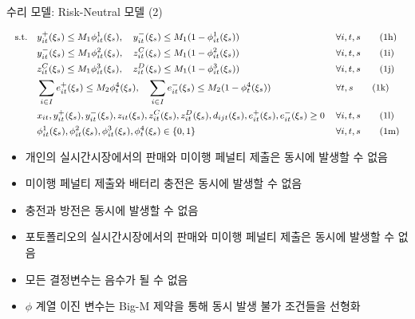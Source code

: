 \documentclass[xcolor=dvipsnames,t,9pt]{beamer}
\begin{document}
\begin{frame}{수리 모델: Risk-Neutral 모델 (2)}
    \vspace{-1em}
    \begin{block}{}
        \vspace{-0.7em}
        \begin{subequations}
            \footnotesize
            \begin{flalign}
                \text{s.t.} \quad
                 & y^+_{it}(\xi_s) \le M_1 \phi^1_{it}(\xi_s), \quad
                y^-_{it}(\xi_s) \le M_1 (1 - \phi^1_{it}(\xi_s))
                 &                                                                 & \forall i, t, s \tag{1h} \\
                 & y^-_{it}(\xi_s) \le M_1 \phi^2_{it}(\xi_s), \quad
                z^C_{it}(\xi_s) \le M_1 (1 - \phi^2_{it}(\xi_s))
                 &                                                                 & \forall i, t, s \tag{1i} \\
                 & z^C_{it}(\xi_s) \le M_1 \phi^3_{it}(\xi_s), \quad
                z^D_{it}(\xi_s) \le M_1 (1 - \phi^3_{it}(\xi_s))
                 &                                                                 & \forall i, t, s \tag{1j} \\
                 & \sum_{i \in I} e^+_{it}(\xi_s) \le M_2 \phi^4_{t}(\xi_s), \quad
                \sum_{i \in I} e^-_{it}(\xi_s) \le M_2 (1 - \phi^4_{t}(\xi_s))
                 &                                                                 & \forall t, s \tag{1k}    \\
                 & x_{it}, y^+_{it}(\xi_s), y^-_{it}(\xi_s), z_{it}(\xi_s),
                z^C_{it}(\xi_s), z^D_{it}(\xi_s), d_{ijt}(\xi_s), e^+_{it}(\xi_s),
                e^-_{it}(\xi_s) \ge 0
                 &                                                                 & \forall i, t, s \tag{1l} \\
                 & \phi^1_{it}(\xi_s), \phi^2_{it}(\xi_s), \phi^3_{it}(\xi_s),
                \phi^4_{t}(\xi_s) \in \{0, 1\}
                 &                                                                 & \forall i, t, s \tag{1m}
            \end{flalign}
        \end{subequations}
    \end{block}
    \small
    \begin{itemize}
        \item[(1h)] 개인의 실시간시장에서의 판매와 미이행 페널티 제출은 동시에 발생할 수 없음
        \item[(1i)] 미이행 페널티 제출와 배터리 충전은 동시에 발생할 수 없음
        \item[(1j)] 충전과 방전은 동시에 발생할 수 없음
        \item[(1k)] 포토폴리오의 실시간시장에서의 판매와 미이행 페널티 제출은 동시에 발생할 수 없음
        \item[(1l)] 모든 결정변수는 음수가 될 수 없음
        \item[(1m)] $\phi$ 계열 이진 변수는 Big-M 제약을 통해 동시 발생 불가 조건들을 선형화
    \end{itemize}
\end{frame}
\end{document}
